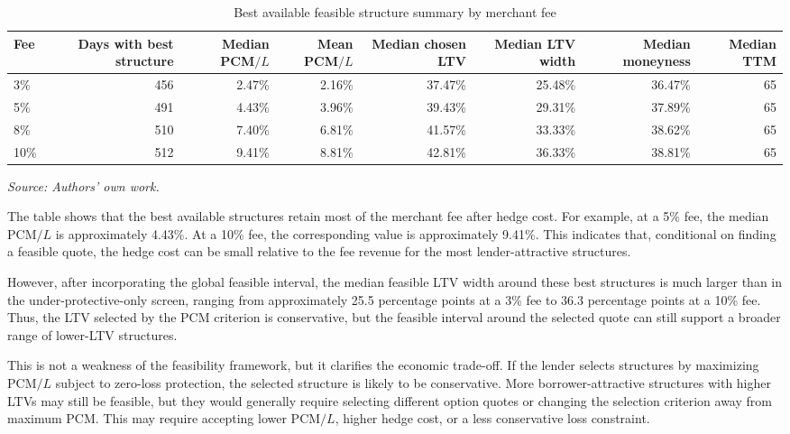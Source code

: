 \documentclass[11pt]{article}
\begin{document}
\begin{table}[htbp]
\centering
\caption{Best available feasible structure summary by merchant fee}
\label{tab:best_available_structures}
\small
\begin{adjustbox}{max width=\textwidth}
\begin{tabular}{lrrrrrrr}
\toprule
Fee & Days with best structure & Median PCM$/L$ & Mean PCM$/L$ & Median chosen LTV & Median LTV width & Median moneyness & Median TTM \\
\midrule
3\%  & 456 & 2.47\% & 2.16\% & 37.47\% & 25.48\% & 36.47\% & 65 \\
5\%  & 491 & 4.43\% & 3.96\% & 39.43\% & 29.31\% & 37.89\% & 65 \\
8\%  & 510 & 7.40\% & 6.81\% & 41.57\% & 33.33\% & 38.62\% & 65 \\
10\% & 512 & 9.41\% & 8.81\% & 42.81\% & 36.33\% & 38.81\% & 65 \\
\bottomrule
\end{tabular}
\end{adjustbox}
\vspace{-0.5em}
\begin{flushleft}
\footnotesize \textit{Source: Authors' own work.}
\end{flushleft}
\end{table}

The table shows that the best available structures retain most of the merchant fee after hedge cost. For example, at a 5\% fee, the median $\text{PCM}/L$ is approximately 4.43\%. At a 10\% fee, the corresponding value is approximately 9.41\%. This indicates that, conditional on finding a feasible quote, the hedge cost can be small relative to the fee revenue for the most lender-attractive structures.

However, after incorporating the global feasible interval, the median feasible LTV width around these best structures is much larger than in the under-protective-only screen, ranging from approximately 25.5 percentage points at a 3\% fee to 36.3 percentage points at a 10\% fee. Thus, the LTV selected by the PCM criterion is conservative, but the feasible interval around the selected quote can still support a broader range of lower-LTV structures.

This is not a weakness of the feasibility framework, but it clarifies the economic trade-off. If the lender selects structures by maximizing $\text{PCM}/L$ subject to zero-loss protection, the selected structure is likely to be conservative. More borrower-attractive structures with higher LTVs may still be feasible, but they would generally require selecting different option quotes or changing the selection criterion away from maximum PCM. This may require accepting lower $\text{PCM}/L$, higher hedge cost, or a less conservative loss constraint.
\end{document}
